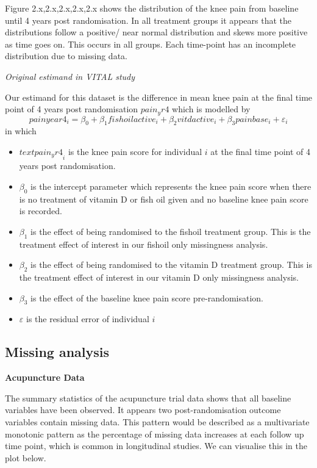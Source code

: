\documentclass{article}
\providecommand{\tightlist}{%
  \setlength{\itemsep}{0pt}\setlength{\parskip}{0pt}}
\begin{document}
Figure 2.x,2.x,2.x,2.x,2.x shows the distribution of the knee pain from
baseline until 4 years post randomisation. In all treatment groups it
appears that the distributions follow a positive/ near normal
distribution and skews more positive as time goes on. This occurs in all
groups. Each time-point has an incomplete distribution due to missing
data.

\emph{Original estimand in VITAL study}

Our estimand for this dataset is the difference in mean knee pain at the
final time point of 4 years post randomisation \(pain_yr4\) which is
modelled by
\[painyear4_i = \beta_0 + \beta_1 fishoilactive_i + \beta_2 vitdactive_i + \beta_3 painbase_i + \varepsilon_i\]
in which

\begin{itemize}
\tightlist
\item
  \(text{pain_yr4}_i\) is the knee pain score for individual \(i\) at
  the final time point of 4 years post randomisation.
\item
  \(\beta_0\) is the intercept parameter which represents the knee pain
  score when there is no treatment of vitamin D or fish oil given and no
  baseline knee pain score is recorded.
\item
  \(\beta_1\) is the effect of being randomised to the fishoil treatment
  group. This is the treatment effect of interest in our fishoil only
  missingness analysis.
\item
  \(\beta_2\) is the effect of being randomised to the vitamin D
  treatment group. This is the treatment effect of interest in our
  vitamin D only missingness analysis.
\item
  \(\beta_3\) is the effect of the baseline knee pain score
  pre-randomisation.
\item
  \(\varepsilon\) is the residual error of individual \(i\)
\end{itemize}

\subsection{Missing analysis}\label{missing-analysis}

\textbf{Acupuncture Data}

The summary statistics of the acupuncture trial data shows that all
baseline variables have been observed. It appears two post-randomisation
outcome variables contain missing data. This pattern would be described
as a multivariate monotonic pattern as the percentage of missing data
increases at each follow up time point, which is common in longitudinal
studies. We can visualise this in the plot below.
\end{document}
